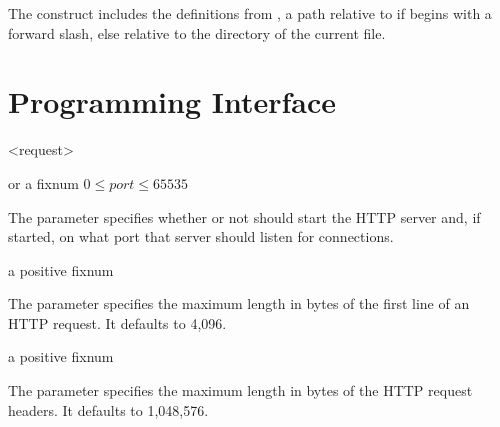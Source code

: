 \begin{syntax}
\end{syntax}\antipar

The  construct includes the definitions from
, a path relative to  if
 begins with a forward slash, else relative to the
directory of the current file.


\section {Programming Interface}

\begin{tupledef}{<request>}
\end{tupledef}

\begin{parameter}
\end{parameter}
\hasvalue{}  or a fixnum $0 \le port \le 65535$

The  parameter specifies whether or not
 should start the HTTP server and,
if started, on what port that server should listen for connections.

\begin{parameter}
\end{parameter}
\hasvalue{} a positive fixnum

The  parameter specifies the maximum length
in bytes of the first line of an HTTP request. It defaults to 4,096.

\begin{parameter}
\end{parameter}
\hasvalue{} a positive fixnum

The  parameter specifies the maximum length in
bytes of the HTTP request headers. It defaults to 1,048,576.


